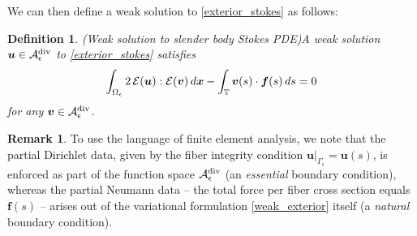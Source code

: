 \documentclass[11pt]{article}
\numberwithin{equation}{section}
\newcommand{\T}{\mathbb{T}}
\newcommand{\A}{\mathcal{A}}
\newcommand{\bu}{\bm{u}}
\newcommand{\bx}{\bm{x}}
\newcommand{\bv}{\bm{v}}
\newcommand{\ts}{\thinspace}
\newcommand{\dive}{{\rm{div}}}
\newtheorem{definition}[theorem]{Definition}
\theoremstyle{definition}
\newtheorem{remark}[theorem]{Remark}
\begin{document}

We can then define a weak solution to \eqref{exterior_stokes} as follows:
\begin{definition}{(Weak solution to slender body Stokes PDE)}\label{weak_sol_def} 
A weak solution $\bu\in \A_{\epsilon}^{\dive}$ to \eqref{exterior_stokes} satisfies
\begin{equation}\label{weak_exterior}
\int_{\Omega_{\epsilon}} 2\ts \mathcal{E}(\bu):\mathcal{E}(\bv)\ts d\bx - \int_{\T} \bv(s)\cdot{\bm f}(s)\ts ds =0
\end{equation}
for any $\bv \in \A_{\epsilon}^{\dive}$. 
\end{definition} 

\begin{remark}
To use the language of finite element analysis, we note that the partial Dirichlet data, given by the fiber integrity condition $\bu\big|_{\Gamma_{\epsilon}}=\bu(s)$, is enforced as part of the function space $\A_{\epsilon}^{\dive}$ (an \emph{essential} boundary condition), whereas the partial Neumann data -- the total force per fiber cross section equals ${\bm f}(s)$ -- arises out of the variational formulation \eqref{weak_exterior} itself (a \emph{natural} boundary condition). 
\end{remark}
\end{document}
